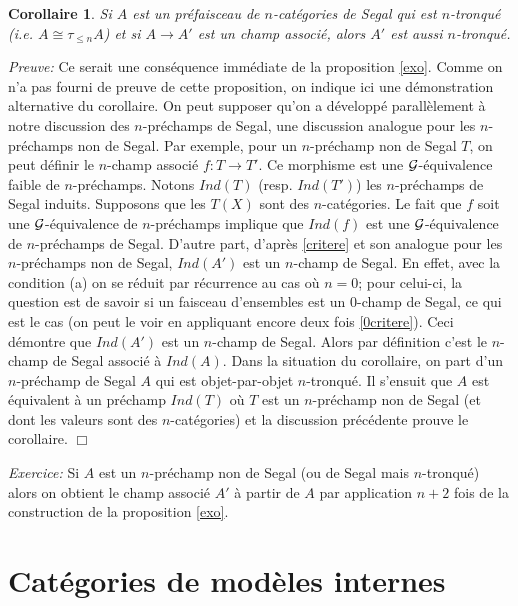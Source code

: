\documentclass[12pt]{article}
\newcommand{\numero}[1]{\newpage\section{#1}}
\newcommand{\eop}{\hfill $\Box$\vspace{.1in}}
\newtheorem{corollaire}[lemma]{Corollaire}
\newcommand{\Gg}{{\cal G}}
\begin{document}
\begin{corollaire}
\label{preservetronque}
Si $A$ est un pr\'efaisceau de $n$-cat\'egories de Segal qui est $n$-tronqu\'e
(i.e. $A\cong \tau _{\leq n}A$) et si $A\rightarrow A'$ est un champ associ\'e,
alors $A'$ est aussi $n$-tronqu\'e.
\end{corollaire}
{\em Preuve:} Ce serait une cons\'equence imm\'ediate de
la proposition \ref{exo}.
Comme on n'a pas fourni de preuve de
cette proposition, on indique ici une d\'emonstration alternative du corollaire.
On peut supposer qu'on a d\'evelopp\'e parall\`element \`a notre discussion des
$n$-pr\'echamps de Segal, une discussion analogue pour les $n$-pr\'echamps
non de Segal.
Par exemple,  pour un $n$-pr\'echamp non de Segal $T$, on peut d\'efinir le
$n$-champ associ\'e $f:T\rightarrow T'$. Ce morphisme est une
$\Gg$-\'equivalence
faible de $n$-pr\'echamps.  Notons $Ind(T)$ (resp. $Ind(T')$) les
$n$-pr\'echamps de Segal induits.
Supposons que les $T(X)$ sont des
$n$-cat\'egories.
Le fait  que $f$ soit une $\Gg$-\'equivalence de
$n$-pr\'echamps implique que $Ind(f)$ est une $\Gg$-\'equivalence de
$n$-pr\'echamps de Segal. D'autre part, d'apr\`es \ref{critere} et son analogue
pour les $n$-pr\'echamps non de Segal, $Ind(A')$ est un $n$-champ
de Segal. En effet, avec la condition (a) on se r\'eduit par r\'ecurrence au cas
o\`u $n=0$; pour celui-ci, la question est de savoir si un faisceau
d'ensembles est un
$0$-champ de Segal, ce qui est le cas (on peut le voir en appliquant encore
deux fois \ref{0critere}). Ceci d\'emontre que $Ind(A')$ est un $n$-champ de
Segal. Alors par d\'efinition c'est le $n$-champ de Segal associ\'e \`a
$Ind(A)$. Dans la situation du corollaire, on part d'un $n$-pr\'echamp
de Segal $A$ qui est objet-par-objet $n$-tronqu\'e. Il s'ensuit que
$A$ est \'equivalent \`a
un pr\'echamp $Ind(T)$ o\`u $T$ est un $n$-pr\'echamp non de Segal
(et dont les valeurs sont des $n$-cat\'egories) et la discussion
pr\'ec\'edente prouve le
corollaire.
\eop

{\em Exercice:} Si $A$ est un $n$-pr\'echamp non de Segal (ou de Segal mais
$n$-tronqu\'e) alors on obtient le champ associ\'e  $A'$  \`a partir de $A$ par
application $n+2$ fois de la construction de la proposition \ref{exo}.

\numero{Cat\'egories de mod\`eles internes}

\label{cmipage}
\end{document}
